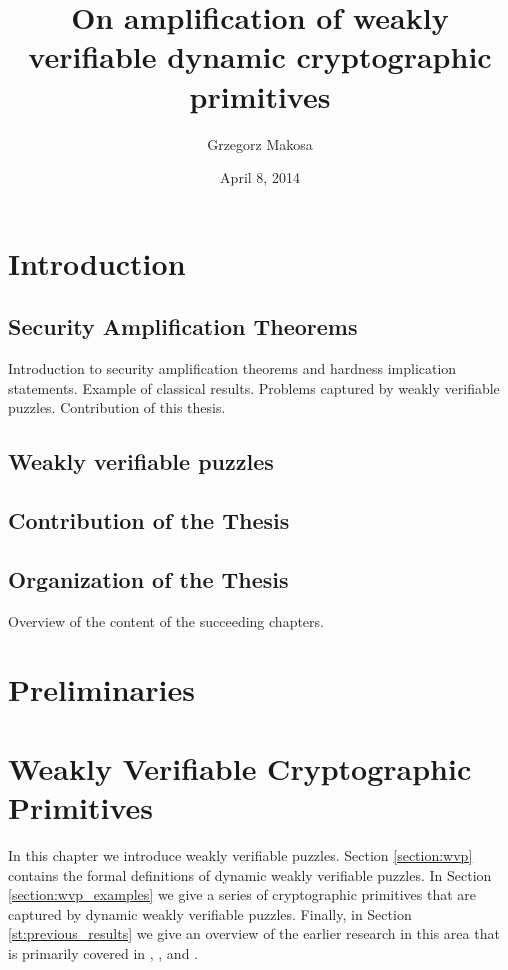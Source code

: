 \documentclass[11pt,a4paper,titlepage]{memoir}
\title{On amplification of weakly verifiable dynamic cryptographic primitives}
\author{Grzegorz Makosa}
\date{April 8, 2014}
\begin{document}
\frontmatter

%

\cleartorecto
\tableofcontents
\mainmatter

\chapter{Introduction}
\section{Security Amplification Theorems}
Introduction to security amplification theorems and hardness implication statements.
Example of classical results. Problems captured by weakly verifiable puzzles.
Contribution of this thesis.
\section{Weakly verifiable puzzles}
\section{Contribution of the Thesis}
\section{Organization of the Thesis}
Overview of the content of the succeeding chapters.

\chapter{Preliminaries}


\chapter{Weakly Verifiable Cryptographic Primitives}
In this chapter we introduce weakly verifiable puzzles.
Section \ref{section:wvp} contains the formal definitions of dynamic weakly verifiable puzzles.
In Section \ref{section:wvp_examples} we give a series of cryptographic primitives that are captured by dynamic weakly verifiable puzzles.
Finally, in Section \ref{st:previous_results} we give an overview of the earlier research in this area
that is primarily covered in \cite{canetti2004hardness}, \cite{Dodis:2009:SAI:1530441.1530450}, and \cite{DBLP:journals/corr/abs-1002-3534}.
\end{document}
